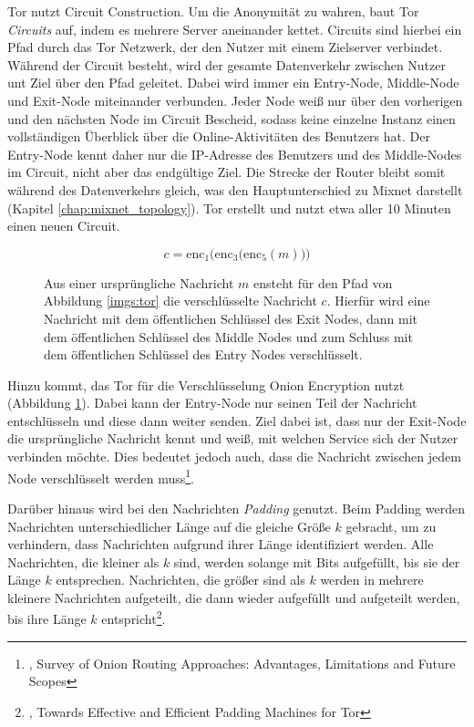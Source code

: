 Tor nutzt Circuit Construction. Um die Anonymität zu wahren, baut Tor \textit{Circuits} auf, indem es mehrere Server aneinander kettet. Circuits sind hierbei ein Pfad durch das Tor Netzwerk, der den Nutzer mit einem Zielserver verbindet. Während der Circuit besteht, wird der gesamte Datenverkehr zwischen Nutzer unt Ziel über den Pfad geleitet. Dabei wird immer ein Entry-Node, Middle-Node und Exit-Node miteinander verbunden. Jeder Node weiß nur über den vorherigen und den nächsten Node im Circuit Bescheid, sodass keine einzelne Instanz einen vollständigen Überblick über die Online-Aktivitäten des Benutzers hat. Der Entry-Node kennt daher nur die IP-Adresse des Benutzers und des Middle-Nodes im Circuit, nicht aber das endgültige Ziel. Die Strecke der Router bleibt somit während des Datenverkehrs gleich, was den Hauptunterschied zu Mixnet darstellt (Kapitel \ref{chap:mixnet_topology}). Tor erstellt und nutzt etwa aller 10 Minuten einen neuen Circuit.

\begin{figure}[!h]
    \begin{displaymath}
        c = \mathrm{enc}_{1}\Big(\mathrm{enc}_{3}\big(\mathrm{enc}_{5}(m)\big)\Big)
    \end{displaymath}
    \caption{Aus einer ursprüngliche Nachricht $m$ ensteht für den Pfad von Abbildung \ref{imgs:tor} die verschlüsselte Nachricht $c$. Hierfür wird eine Nachricht mit dem öffentlichen Schlüssel des Exit Nodes, dann mit dem öffentlichen Schlüssel des Middle Nodes und zum Schluss mit dem öffentlichen Schlüssel des Entry Nodes verschlüsselt.}
    \label{equa:encryption}
\end{figure}

Hinzu kommt, das Tor für die Verschlüsselung Onion Encryption nutzt (Abbildung \ref{equa:encryption}). Dabei kann der Entry-Node nur seinen Teil der Nachricht entschlüsseln und diese dann weiter senden. Ziel dabei ist, dass nur der Exit-Node die ursprüngliche Nachricht kennt und weiß, mit welchen Service sich der Nutzer verbinden möchte. Dies bedeutet jedoch auch, dass die Nachricht zwischen jedem Node verschlüsselt werden muss\footnote{\cite{OnionRoutingApproaches}, Survey of Onion Routing Approaches: Advantages, Limitations and Future Scopes}.

Darüber hinaus wird bei den Nachrichten \textit{Padding} genutzt. Beim Padding werden Nachrichten unterschiedlicher Länge auf die gleiche Größe $k$ gebracht, um zu verhindern, dass Nachrichten aufgrund ihrer Länge identifiziert werden. Alle Nachrichten, die kleiner als $k$ sind, werden solange mit Bits aufgefüllt, bis sie der Länge $k$ entsprechen. Nachrichten, die größer sind als $k$ werden in mehrere kleinere Nachrichten aufgeteilt, die dann wieder aufgefüllt und aufgeteilt werden, bis ihre Länge $k$ entspricht\footnote{\cite{TorPadding}, Towards Effective and Efficient Padding Machines for Tor}.

